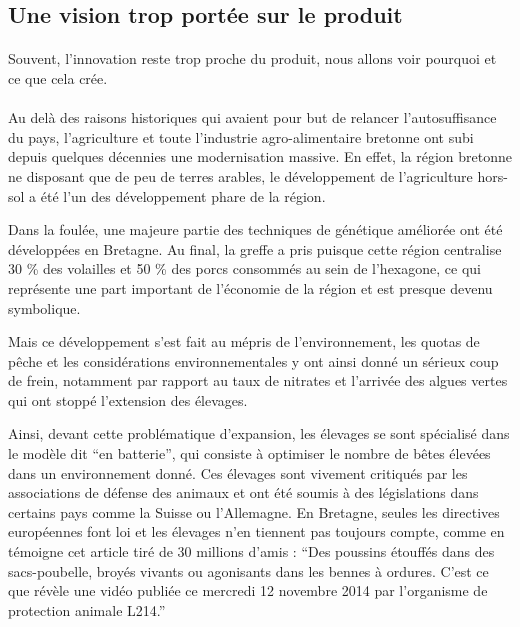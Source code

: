 \documentclass[a4paper,12pt]{report}
\begin{document}
		\subsection{Une vision trop portée sur le produit}
		\paragraph{}Souvent, l'innovation reste trop proche du produit, nous allons voir pourquoi et ce que cela crée.
		
			\paragraph{}Au delà des raisons historiques qui avaient pour but de relancer l’autosuffisance du pays, l’agriculture et toute l’industrie agro-alimentaire bretonne ont subi depuis quelques décennies une modernisation massive. En effet, la région bretonne ne disposant que de peu de terres arables, le développement de l’agriculture hors-sol a été l’un des développement phare de la région. 
			
			Dans la foulée, une majeure partie des techniques de génétique améliorée ont été développées en Bretagne. Au final, la greffe a pris puisque cette région centralise 30 \% des volailles et 50 \% des porcs consommés au sein de l’hexagone, ce qui représente une part important de l’économie de la région et est presque devenu symbolique.
			
			Mais ce développement s’est fait au mépris de l’environnement, les quotas de pêche et les considérations environnementales y ont ainsi donné un sérieux coup de frein, notamment par rapport au taux de nitrates et l’arrivée des algues vertes qui ont stoppé l’extension des élevages.
			
			Ainsi, devant cette problématique d’expansion, les élevages se sont spécialisé dans le modèle dit “en batterie”, qui consiste à optimiser le nombre de bêtes élevées dans un environnement donné. Ces élevages sont vivement critiqués par les associations de défense des animaux  et ont été soumis à des législations dans certains pays comme la Suisse ou l’Allemagne. En Bretagne, seules les directives européennes font loi et les élevages n’en tiennent pas toujours compte, comme en témoigne cet article tiré de 30 millions d’amis\cite{BretagnePoussinsBroyesEtouffesDansCouvoir} : “Des poussins étouffés dans des sacs-poubelle, broyés vivants ou agonisants dans les bennes à ordures. C'est ce que révèle une vidéo publiée ce mercredi 12 novembre 2014 par l’organisme de protection animale L214.”
			
\end{document}
